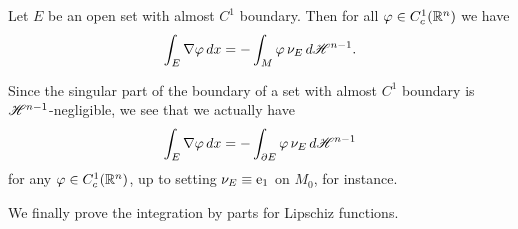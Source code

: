 \begin{theorem} \label{thm:Gauss_Green_almost_C_1}
Let $E$ be an open set with almost $C^{1}$ boundary. Then for all $\varphi \in C^{1}_{c}(\mathbb{R}^{n})$ we have
\begin{equation*}
\int_{E} \nabla \varphi \,dx = - \int_{M} \varphi \, \nu_{E} \, d \mathscr{H}^{n - 1}.
\end{equation*}
\end{theorem}

\begin{remark}
Since the singular part of the boundary of a set with almost $C^1$ boundary is $\mathscr{H}^{n - 1}$-negligible, we see that we actually have
\begin{equation*}
\int_{E} \nabla \varphi \,dx = - \int_{\partial E} \varphi \, \nu_{E} \, d \mathscr{H}^{n - 1}
\end{equation*}
for any $\varphi \in C^{1}_{c}(\mathbb{R}^{n})$, up to setting $\nu_{E} \equiv {\rm e}_{1}$ on $M_{0}$, for instance.
\end{remark}

We finally prove the integration by parts for Lipschiz functions.

